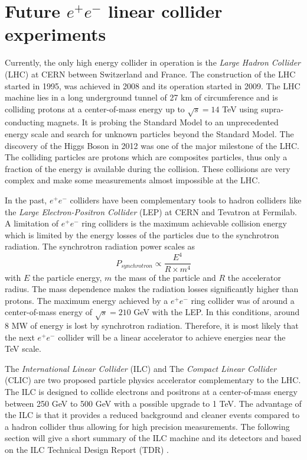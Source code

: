 \chapter{Future $e^+e^-$ linear collider experiments}
\label{chap:FutureColliders}

Currently, the only high energy collider in operation is the \textit{Large Hadron Collider} (LHC) at CERN between Switzerland and France. The construction of the LHC started in 1995, was achieved in 2008 and its operation started in 2009. The LHC machine lies in a long underground tunnel of 27 km of circumference and is colliding protons at a center-of-mass energy up to $\sqrt{s} = 14$ TeV using supra-conducting magnets. It is probing the Standard Model to an unprecedented energy scale and search for unknown particles beyond the Standard Model. The discovery of the Higgs Boson in 2012 was one of the major milestone of the LHC. The colliding particles are protons which are composites particles, thus only a fraction of the energy is available during the collision. These collisions are very complex and make some measurements almost impossible at the LHC.

In the past, $e^+e^-$ colliders have been complementary tools to hadron colliders like the \textit{Large Electron-Positron Collider} (LEP) at CERN and Tevatron at Fermilab. A limitation of $e^+e^-$ ring colliders is the maximum achievable collision energy which is limited by the energy losses of the particles due to the synchrotron radiation. The synchrotron radiation power scales as
\begin{equation}
P_{synchrotron} \propto \frac{E^4}{R \times m^4}
\end{equation}
with $E$ the particle energy, $m$ the mass of the particle and $R$ the accelerator radius. The mass dependence makes the radiation losses significantly higher than protons. The maximum energy achieved by a $e^+e^-$ ring collider was of around a center-of-mass energy of $\sqrt{s} = 210$ GeV with the LEP. In this conditions, around 8 MW of energy is lost by synchrotron radiation.
Therefore, it is most likely that the next $e^+e^-$ collider will be a linear accelerator to achieve energies near the TeV scale.

The \textit{International Linear Collider} (ILC) and The \textit{Compact Linear Collider} (CLIC) are two proposed particle physics accelerator complementary to the LHC. The ILC is designed to collide electrons and positrons at a center-of-mass energy between 250 GeV to 500 GeV with a possible upgrade to 1 TeV. The advantage of the ILC is that it provides a reduced background and cleaner events compared to a hadron collider thus allowing for high precision measurements. The following section will give a short summary of the ILC machine and its detectors and based on the ILC Technical Design Report (TDR) \cite{ILC_TDR_Vol1, ILC_TDR_Vol2, ILC_TDR_Vol3.1, ILC_TDR_Vol3.2, ILC_TDR_Vol4}.

